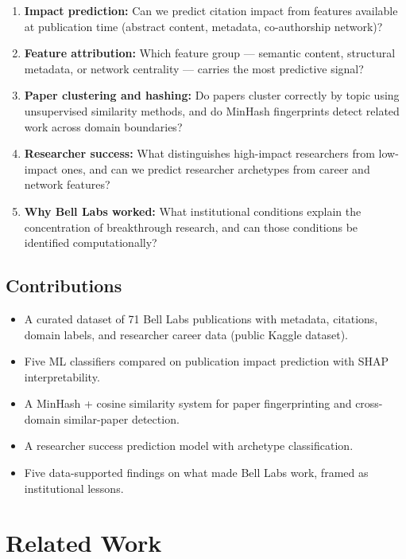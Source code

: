 \documentclass[journal]{IEEEtran}
\begin{document}
\begin{enumerate}
    \item \textbf{Impact prediction:} Can we predict citation impact from
          features available at publication time (abstract content, metadata,
          co-authorship network)?
    \item \textbf{Feature attribution:} Which feature group --- semantic
          content, structural metadata, or network centrality --- carries
          the most predictive signal?
    \item \textbf{Paper clustering and hashing:} Do papers cluster correctly
          by topic using unsupervised similarity methods, and do MinHash
          fingerprints detect related work across domain boundaries?
    \item \textbf{Researcher success:} What distinguishes high-impact
          researchers from low-impact ones, and can we predict researcher
          archetypes from career and network features?
    \item \textbf{Why Bell Labs worked:} What institutional conditions
          explain the concentration of breakthrough research, and can those
          conditions be identified computationally?
\end{enumerate}

\subsection{Contributions}

\begin{itemize}
    \item A curated dataset of 71 Bell Labs publications with metadata,
          citations, domain labels, and researcher career data (public
          Kaggle dataset).
    \item Five ML classifiers compared on publication impact prediction
          with SHAP interpretability.
    \item A MinHash + cosine similarity system for paper fingerprinting
          and cross-domain similar-paper detection.
    \item A researcher success prediction model with archetype classification.
    \item Five data-supported findings on what made Bell Labs work, framed
          as institutional lessons.
\end{itemize}


\section{Related Work}
\label{sec:related}
\end{document}
